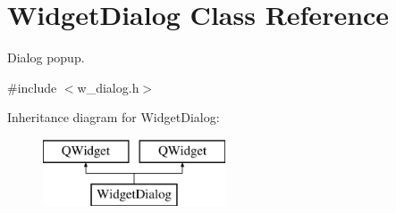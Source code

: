 \hypertarget{class_widget_dialog}{}\section{Widget\+Dialog Class Reference}
\label{class_widget_dialog}


Dialog popup.  




{\ttfamily \#include $<$w\+\_\+dialog.\+h$>$}

Inheritance diagram for Widget\+Dialog\+:\begin{figure}[H]
\begin{center}
\leavevmode
\includegraphics[height=2.000000cm]{class_widget_dialog}
\end{center}
\end{figure}
